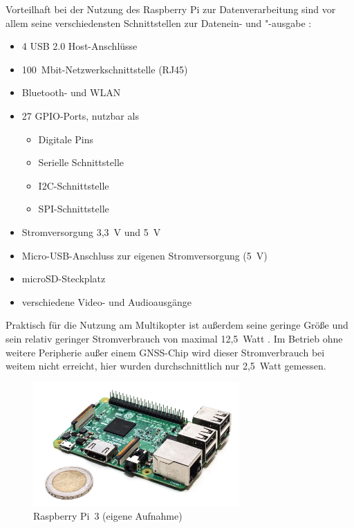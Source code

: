 \documentclass[a4paper,12pt,bibliography=totoc, listof=totoc,titlepage,pointlessnumbers]{scrreprt}
\begin{document}
Vorteilhaft bei der Nutzung des Rasp\-berry Pi zur Datenverarbeitung sind vor allem seine verschiedensten Schnittstellen zur Datenein- und "-ausgabe \citep{raspSheet}:
\begin{itemize}
 \item 4 USB 2.0 Host-Anschlüsse
 \item 100~Mbit-Netzwerkschnittstelle (RJ45)
 \item Bluetooth- und WLAN
 \item 27 GPIO-Ports, nutzbar als \citep{ekRaspPin}
 \begin{itemize} 
  \item Digitale Pins
  \item Serielle Schnittstelle
  \item I2C-Schnittstelle
  \item SPI-Schnittstelle
 \end{itemize}
 \item Stromversorgung 3,3~V und 5~V
 \item Micro-USB-Anschluss zur eigenen Stromversorgung (5~V)
 \item microSD-Steckplatz 
 \item verschiedene Video- und Audioausgänge
 \end{itemize}

Praktisch für die Nutzung am Multikopter ist außerdem seine geringe Größe und sein relativ geringer Stromverbrauch von maximal 12,5~Watt \citep{raspSheet}. Im Betrieb ohne weitere Peripherie außer einem GNSS-Chip wird dieser Stromverbrauch bei weitem nicht erreicht, hier wurden durchschnittlich nur 2,5~Watt gemessen.

\begin{figure}[!ht]
 \centering
 \includegraphics[width=0.7\textwidth]{./img/rpi3.jpg}
 \caption{Rasp\-berry Pi~3 (eigene Aufnahme)}
 \label{img:rpi3}
\end{figure}
\end{document}
